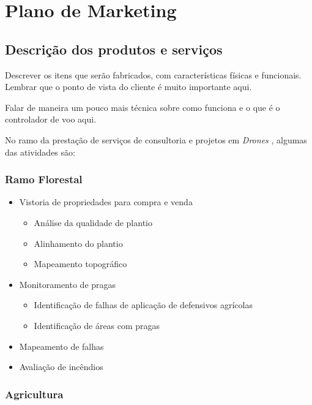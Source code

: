\section{Plano de Marketing}

\subsection{Descrição dos produtos e serviços}

Descrever os itens que serão fabricados, com características físicas e 
funcionais. Lembrar que o ponto de vista do cliente é muito importante aqui.

Falar de maneira um pouco mais técnica sobre como funciona e o que é o 
controlador de voo aqui.

No ramo da prestação de serviços de consultoria e projetos em \emph{Drones}
, algumas das atividades são:

\subsubsection*{Ramo Florestal}

\begin{itemize}
	\item Vistoria de propriedades para compra e venda
	\begin{itemize}
		\item Análise da qualidade de plantio
		\item Alinhamento do plantio
		\item Mapeamento topográfico
	\end{itemize}
	\item Monitoramento de pragas
	\begin{itemize}
		\item Identificação de falhas de aplicação de defensivos agrícolas
		\item Identificação de áreas com pragas
	\end{itemize}
	\item Mapeamento de falhas
	\item Avaliação de incêndios
\end{itemize}

\subsubsection*{Agricultura}

